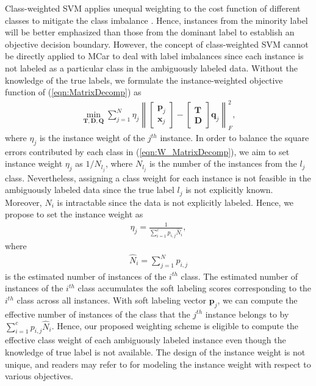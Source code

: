 \documentclass[10pt,journal,compsoc]{IEEEtran}
\begin{document}
Class-weighted SVM applies unequal weighting to the cost function of different classes to mitigate the class imbalance \cite{Veropouloscts1999}. Hence, instances from the minority label will be better emphasized than those from the dominant label to establish an objective decision boundary.
However, the concept of class-weighted SVM cannot be directly applied to MCar to deal with label imbalances since each instance is not labeled as a particular class in the ambiguously labeled data. Without the knowledge of the true labels, we formulate the instance-weighted objective function of (\ref{eqn:MatrixDecomp}) as
\begin{equation}
\begin{aligned}
\min_{\mathbf{T}, \mathbf{D}, \mathbf{Q}} \sum_{j=1}^N \eta_j \left\|
\begin{bmatrix}
\mathbf{p}_j \\
\mathbf{x}_j
\end{bmatrix}
-
\begin{bmatrix}
\mathbf{T} \\
\mathbf{D}
\end{bmatrix}\mathbf{q}_j
\right\|_F^2
,
\end{aligned}\label{eqn:W_MatrixDecomp}
\end{equation}
where $\eta_j$ is the instance weight of the $j^{th}$ instance. In order to balance the square errors contributed by each class in (\ref{eqn:W_MatrixDecomp}), we aim to set instance weight $\eta_j$ as $1/N_{l_j}$, where $N_{l_j}$ is the number of the instances from the $l_j$ class. Nevertheless, assigning a class weight for each instance is not feasible in the ambiguously labeled data since the true label $l_j$ is not explicitly known. Moreover, $N_{i}$ is intractable since the data is not explicitly labeled. Hence, we propose to set the instance weight as
\begin{equation}
\begin{aligned}
\eta_j = \frac{1}{\sum_{i=1}^c p_{i,j} \hat{N}_i},
\end{aligned}
\end{equation}
where
\begin{equation}
\begin{aligned}
\hat{N}_i =  \sum_{j=1}^N p_{i,j} \label{eqn:est_sub_dist}
\end{aligned}
\end{equation}
is the estimated number of instances of the $i^{th}$ class. The estimated number of instances of the $i^{th}$ class accumulates the soft labeling scores corresponding to the $i^{th}$ class across all instances. With soft labeling vector $\mathbf{p}_{j}$, we can compute the effective number of instances of the class that the $j^{th}$ instance belongs to by $\sum_{i=1}^c p_{i,j} \hat{N}_i$.
Hence, our proposed weighting scheme is eligible to compute the effective class weight of each ambiguously labeled instance even though the knowledge of true label is not available.
The design of the instance weight is not unique, and readers may refer to \cite{Lin2002svm,He2009lfi} for modeling the instance weight with respect to various objectives.
\end{document}
